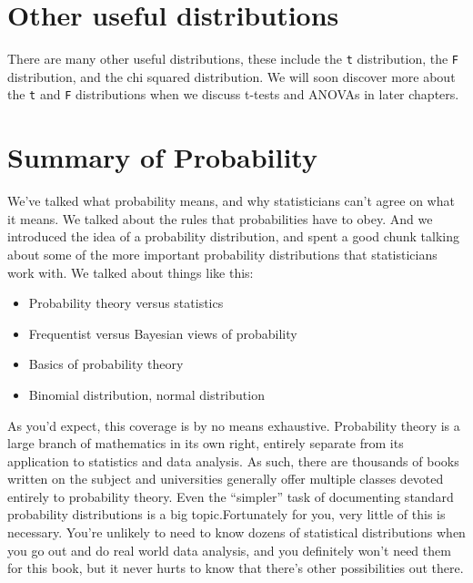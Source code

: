 \documentclass[
]{book}
\begin{document}
\section{Other useful distributions}\label{other-useful-distributions}

There are many other useful distributions, these include the \texttt{t} distribution, the \texttt{F} distribution, and the chi squared distribution. We will soon discover more about the \texttt{t} and \texttt{F} distributions when we discuss t-tests and ANOVAs in later chapters.

\section{Summary of Probability}\label{summary-of-probability}

We've talked what probability means, and why statisticians can't agree on what it means. We talked about the rules that probabilities have to obey. And we introduced the idea of a probability distribution, and spent a good chunk talking about some of the more important probability distributions that statisticians work with. We talked about things like this:

\begin{itemize}
\item
  Probability theory versus statistics
\item
  Frequentist versus Bayesian views of probability
\item
  Basics of probability theory
\item
  Binomial distribution, normal distribution
\end{itemize}

As you'd expect, this coverage is by no means exhaustive. Probability theory is a large branch of mathematics in its own right, entirely separate from its application to statistics and data analysis. As such, there are thousands of books written on the subject and universities generally offer multiple classes devoted entirely to probability theory. Even the ``simpler'' task of documenting standard probability distributions is a big topic.Fortunately for you, very little of this is necessary. You're unlikely to need to know dozens of statistical distributions when you go out and do real world data analysis, and you definitely won't need them for this book, but it never hurts to know that there's other possibilities out there.
\end{document}
